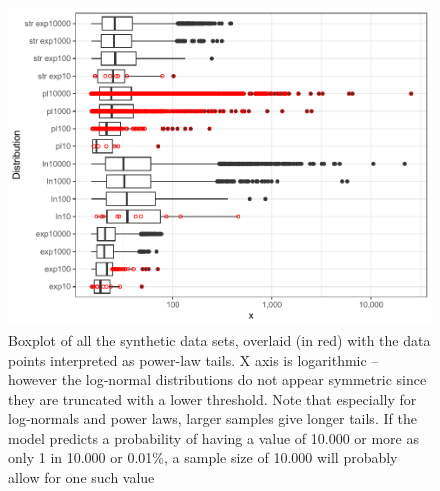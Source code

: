 \documentclass[
  12pt,
]{book}
\begin{document}
\begin{figure}

{\centering \includegraphics[width=0.9\linewidth]{bookdown-demo_files/figure-latex/05-pltails-1} 

}

\caption{Boxplot of all the synthetic data sets, overlaid (in red) with the data points interpreted as power-law tails. X axis is logarithmic -- however the log-normal distributions do not appear symmetric since they are truncated with a lower threshold. Note that especially for log-normals and power laws, larger samples give longer tails. If the model predicts a probability of having a value of 10.000 or more as only 1 in 10.000 or 0.01\%, a sample size of 10.000 will probably allow for one such value}\label{fig:05-pltails}
\end{figure}

\FloatBarrier
\end{document}
